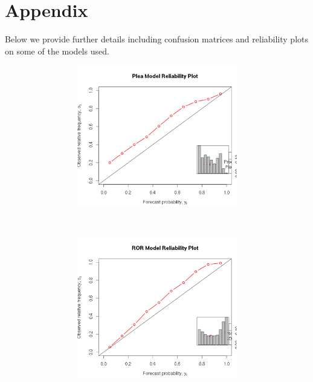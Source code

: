 \newpage
\appendix
\section{Appendix} \label{appendixA}
Below we provide further details including confusion matrices and
reliability plots on some of the models used.

\begin{figure}[h]
  \centering
    \begin{subfigure}[p!]{\textwidth}
            \caption{Non--Quality of Life Cases}
            \begin{subfigure}[p!]{0.49\textwidth}
              \includegraphics[width=\textwidth]{figures/appa.png}
              \label{fig:AppA}
            \end{subfigure}
            ~
            \begin{subfigure}[p!]{0.49\textwidth}
              \includegraphics[width=\textwidth]{figures/appb.png}
              \label{fig:AppB}
            \end{subfigure}
    \end{subfigure}


\end{figure}
